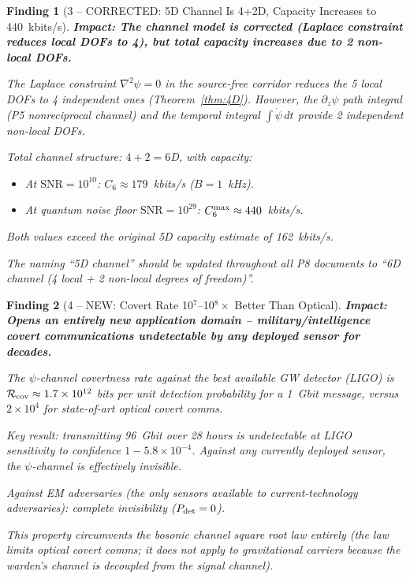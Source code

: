\documentclass[aps,prd,twocolumn,superscriptaddress,nofootinbib]{revtex4-2}
\newcommand{\SNR}{\mathrm{SNR}}
\newtheorem{finding}{Finding}
\begin{document}
\begin{finding}[3 -- CORRECTED: 5D Channel Is 4+2D, Capacity Increases to 440~kbits/s]
\label{find:4D}
\textbf{Impact: The channel model is corrected (Laplace constraint reduces
local DOFs to 4), but total capacity increases due to 2 non-local DOFs.}

The Laplace constraint $\nabla^2\psi = 0$ in the source-free corridor
reduces the 5 local DOFs to 4 independent ones (Theorem~\ref{thm:4D}).
However, the $\partial_z\psi$ path integral (P5 nonreciprocal channel)
and the temporal integral $\int\dot\psi \, dt$ provide 2 independent
non-local DOFs.

Total channel structure: $4 + 2 = 6$D, with capacity:
\begin{itemize}
\item At $\SNR = 10^{10}$: $C_6 \approx 179$~kbits/s ($B = 1$~kHz).
\item At quantum noise floor $\SNR = 10^{29}$: $C_6^{\rm max} \approx 440$~kbits/s.
\end{itemize}
Both values exceed the original 5D capacity estimate of 162~kbits/s.

The naming ``5D channel'' should be updated throughout all P8 documents
to ``6D channel (4 local + 2 non-local degrees of freedom)''.
\end{finding}

\begin{finding}[4 -- NEW: Covert Rate 10$^7$--10$^8\times$ Better Than
Optical]
\label{find:covert}
\textbf{Impact: Opens an entirely new application domain -- military/intelligence
covert communications undetectable by any deployed sensor for decades.}

The $\psi$-channel covertness rate against the best available GW detector
(LIGO) is $\mathcal{R}_{\rm cov} \approx 1.7\times 10^{12}$ bits per unit
detection probability for a 1~Gbit message, versus $2\times 10^4$ for
state-of-art optical covert comms.

Key result: transmitting 96~Gbit over 28 hours is undetectable at LIGO
sensitivity to confidence $1 - 5.8\times 10^{-4}$. Against any currently
deployed sensor, the $\psi$-channel is effectively invisible.

Against EM adversaries (the only sensors available to current-technology
adversaries): complete invisibility ($P_{\rm det} = 0$).

This property circumvents the bosonic channel square root law entirely
(the law limits optical covert comms; it does not apply to gravitational
carriers because the warden's channel is decoupled from the signal channel).
\end{finding}
\end{document}
